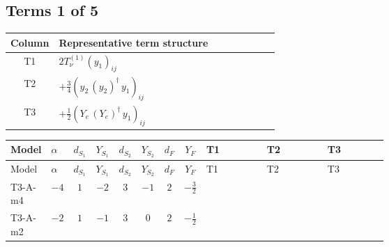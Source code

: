 \documentclass[8pt]{article}
\begin{document}
\begin{landscape}
\subsection*{Terms 1 of 5}
\begin{center}
\begin{tabular}{@{}c >{\raggedright\arraybackslash}p{0.82\linewidth}@{}}
\toprule
Column & Representative term structure \\
\midrule
T1 & \(\displaystyle 2 T_{\nu}^{(1)} \left({y_1}\right)_{ij}\) \\
\midrule
T2 & \(\displaystyle +\frac{3}{4} \left({y_2}\,\left({y_2}\right)^{\dagger}\,{y_1}\right)_{ij}\) \\
\midrule
T3 & \(\displaystyle +\frac{1}{2} \left({Y_e}\,\left({Y_e}\right)^{\dagger}\,{y_1}\right)_{ij}\) \\
\midrule
\bottomrule
\end{tabular}
\end{center}
\smallskip
\tiny
\begin{longtable}{@{}llcccccc >{\raggedright\arraybackslash}p{0.21\linewidth} >{\raggedright\arraybackslash}p{0.21\linewidth} >{\raggedright\arraybackslash}p{0.21\linewidth}@{}}
\toprule
Model & $\alpha$ & $d_{S_1}$ & $Y_{S_1}$ & $d_{S_2}$ & $Y_{S_2}$ & $d_F$ & $Y_F$ & T1 & T2 & T3 \\
\midrule
\endfirsthead
\toprule
Model & $\alpha$ & $d_{S_1}$ & $Y_{S_1}$ & $d_{S_2}$ & $Y_{S_2}$ & $d_F$ & $Y_F$ & T1 & T2 & T3 \\
\midrule
\endhead
T3-A-m4 & $-4$ & $1$ & $-2$ & $3$ & $-1$ & $2$ & $-\frac{3}{2}$ & \scriptsize\adjustbox{max width=\linewidth}{$\begin{gathered} 2 T_{\nu}^{(1)} \left({y_1}\right)_{ij}\end{gathered}$} & \scriptsize\adjustbox{max width=\linewidth}{$\begin{gathered} +\frac{3}{4} \left({y_2}\,\left({y_2}\right)^{\dagger}\,{y_1}\right)_{ij}\end{gathered}$} & \scriptsize\adjustbox{max width=\linewidth}{$\begin{gathered} +\frac{1}{2} \left({Y_e}\,\left({Y_e}\right)^{\dagger}\,{y_1}\right)_{ij}\end{gathered}$} \\
\midrule
T3-A-m2 & $-2$ & $1$ & $-1$ & $3$ & $0$ & $2$ & $-\frac{1}{2}$ & \scriptsize\adjustbox{max width=\linewidth}{$\begin{gathered} 2 T_{\nu}^{(1)} \left({y_1}\right)_{ij}\end{gathered}$} & \scriptsize\adjustbox{max width=\linewidth}{$\begin{gathered} +\frac{3}{4} \left({y_2}\,\left({y_2}\right)^{\dagger}\,{y_1}\right)_{ij}\end{gathered}$} & \scriptsize\adjustbox{max width=\linewidth}{$\begin{gathered} +\frac{1}{2} \left({Y_e}\,\left({Y_e}\right)^{\dagger}\,{y_1}\right)_{ij}\end{gathered}$} \\

\end{longtable}
\end{landscape}
\end{document}
